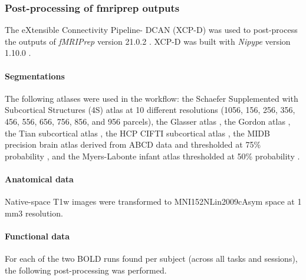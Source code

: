 \documentclass[]{article}
\date{}
\let\oldparagraph\paragraph
\renewcommand{\paragraph}[1]{\oldparagraph{#1}\mbox{}}
\begin{document}
\hypertarget{post-processing-of-fmriprep-outputs}{%
\subsubsection{Post-processing of fmriprep
outputs}\label{post-processing-of-fmriprep-outputs}}

The eXtensible Connectivity Pipeline- DCAN (XCP-D)
\citep{mehta2024xcp, mitigating_2018, satterthwaite_2013} was used to
post-process the outputs of \emph{fMRIPrep} version 21.0.2
\citep[RRID:SCR\_016216]{esteban2019fmriprep, esteban2020analysis}.
XCP-D was built with \emph{Nipype} version 1.10.0
\citep[RRID:SCR\_002502]{nipype1}.

\hypertarget{segmentations}{%
\paragraph{Segmentations}\label{segmentations}}

The following atlases were used in the workflow: the Schaefer
Supplemented with Subcortical Structures (4S) atlas
\citep{Schaefer_2017, pauli2018high, king2019functional, najdenovska2018vivo, glasser2013minimal}
at 10 different resolutions (1056, 156, 256, 356, 456, 556, 656, 756,
856, and 956 parcels), the Glasser atlas \citep{Glasser_2016}, the
Gordon atlas \citep{Gordon_2014}, the Tian subcortical atlas
\citep{tian2020topographic}, the HCP CIFTI subcortical atlas
\citep{glasser2013minimal}, the MIDB precision brain atlas derived from
ABCD data and thresholded at 75\% probability
\citep{hermosillo2024precision}, and the Myers-Labonte infant atlas
thresholded at 50\% probability \citep{myers2023functional}.

\hypertarget{anatomical-data}{%
\paragraph{Anatomical data}\label{anatomical-data}}

Native-space T1w images were transformed to MNI152NLin2009cAsym space at
1 mm3 resolution.

\hypertarget{functional-data}{%
\paragraph{Functional data}\label{functional-data}}

For each of the two BOLD runs found per subject (across all tasks and
sessions), the following post-processing was performed.
\end{document}
